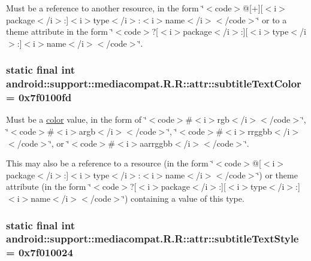 Must be a reference to another resource, in the form \char`\"{}$<$code$>$@\mbox{[}+\mbox{]}\mbox{[}$<$i$>$package$<$/i$>$:\mbox{]}$<$i$>$type$<$/i$>$:$<$i$>$name$<$/i$>$$<$/code$>$\char`\"{} or to a theme attribute in the form \char`\"{}$<$code$>$?\mbox{[}$<$i$>$package$<$/i$>$:\mbox{]}\mbox{[}$<$i$>$type$<$/i$>$:\mbox{]}$<$i$>$name$<$/i$>$$<$/code$>$\char`\"{}. \hypertarget{classandroid_1_1support_1_1mediacompat_1_1_r_1_1attr_907ddafc440daf0129b5e3548b690524}{
\subsubsection[{subtitleTextColor}]{\setlength{\rightskip}{0pt plus 5cm}static final int android::support::mediacompat.R.R::attr::subtitleTextColor = 0x7f0100fd}}
\label{classandroid_1_1support_1_1mediacompat_1_1_r_1_1attr_907ddafc440daf0129b5e3548b690524}


Must be a \hyperlink{classandroid_1_1support_1_1mediacompat_1_1_r_1_1color}{color} value, in the form of \char`\"{}$<$code$>$\#$<$i$>$rgb$<$/i$>$$<$/code$>$\char`\"{}, \char`\"{}$<$code$>$\#$<$i$>$argb$<$/i$>$$<$/code$>$\char`\"{}, \char`\"{}$<$code$>$\#$<$i$>$rrggbb$<$/i$>$$<$/code$>$\char`\"{}, or \char`\"{}$<$code$>$\#$<$i$>$aarrggbb$<$/i$>$$<$/code$>$\char`\"{}. 

This may also be a reference to a resource (in the form \char`\"{}$<$code$>$@\mbox{[}$<$i$>$package$<$/i$>$:\mbox{]}$<$i$>$type$<$/i$>$:$<$i$>$name$<$/i$>$$<$/code$>$\char`\"{}) or theme attribute (in the form \char`\"{}$<$code$>$?\mbox{[}$<$i$>$package$<$/i$>$:\mbox{]}\mbox{[}$<$i$>$type$<$/i$>$:\mbox{]}$<$i$>$name$<$/i$>$$<$/code$>$\char`\"{}) containing a value of this type. \hypertarget{classandroid_1_1support_1_1mediacompat_1_1_r_1_1attr_36d770aba70f1eeae454e655beedcad6}{
\subsubsection[{subtitleTextStyle}]{\setlength{\rightskip}{0pt plus 5cm}static final int android::support::mediacompat.R.R::attr::subtitleTextStyle = 0x7f010024}}
\label{classandroid_1_1support_1_1mediacompat_1_1_r_1_1attr_36d770aba70f1eeae454e655beedcad6}


